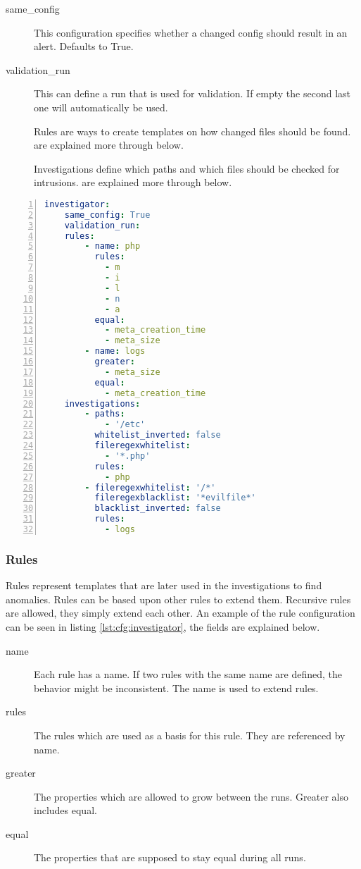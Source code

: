 \begin{description}
    \item [same\_config] This configuration specifies whether a changed config should result in an alert. Defaults to True.
    \item [validation\_run] This can define a run that is used for validation. If empty the second last one will automatically be used.
    \item [] Rules are ways to create templates on how changed files should be found.  are explained more through below.
    \item [] Investigations define which paths and which files should be checked for intrusions.  are explained more through below.
\end{description}

\begin{lstlisting}[language=yaml, numbers=left, caption=Investigator Configuration, label=lst:cfg:investigator]
investigator:
	same_config: True
	validation_run: 
	rules: 
		- name: php
		  rules: 
			- m
			- i
			- l
			- n
			- a
		  equal:
			- meta_creation_time
			- meta_size
		- name: logs
		  greater:
			- meta_size
		  equal:
			- meta_creation_time
	investigations:
		- paths:
			- '/etc'
		  whitelist_inverted: false
		  fileregexwhitelist:
			- '*.php'
		  rules:
			- php
		- fileregexwhitelist: '/*'
		  fileregexblacklist: '*evilfile*'
		  blacklist_inverted: false
		  rules:
			- logs
\end{lstlisting}

\subsubsection{Rules}
\label{sec:config:rules}

Rules represent templates that are later used in the investigations to find anomalies. Rules can be based upon other rules to extend them. Recursive rules are allowed, they simply extend each other. An example of the rule configuration can be seen in listing \ref{lst:cfg:investigator}, the fields are explained below.

\begin{description}
	\item [name] Each rule has a name. If two rules with the same name are defined, the behavior might be inconsistent. The name is used to extend rules.
	\item [rules] The rules which are used as a basis for this rule. They are referenced by name.
	\item [greater] The properties which are allowed to grow between the runs. Greater also includes equal.
	\item [equal] The properties that are supposed to stay equal during all runs.
\end{description}

